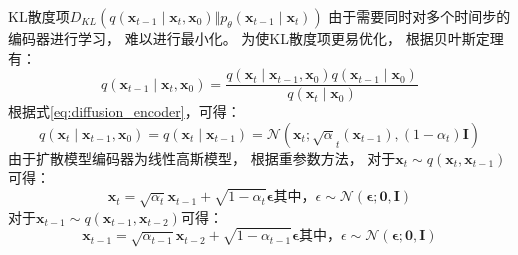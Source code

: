 KL散度项{$D_{KL}(q(\bm{x}_{t-1}\mid \bm{x}_{t},\bm{x}_0)\Vert p_{\theta}(\bm{x}_{t-1}\mid \bm{x}_{t})) $}
由于需要同时对多个时间步的编码器进行学习，
难以进行最小化。
为使KL散度项更易优化，
根据贝叶斯定理有：
\begin{equation}
    \label{eq:diffusion_gaussion_transition_for_kl_divergence}
    q(\bm{x}_{t-1}\mid \bm{x}_{t},\bm{x}_0)=\frac{q(\bm{x}_{t}\mid \bm{x}_{t-1},\bm{x}_0) q(\bm{x}_{t-1}\mid \bm{x}_0)}{q(\bm{x}_{t}\mid \bm{x}_0) }
\end{equation}
根据式{\ref{eq:diffusion_encoder}}，可得：
\begin{equation}
    \label{eq:diffusion_gaussion_transition_for_kl_divergence_likelihood}
    q(\bm{x}_{t}\mid \bm{x}_{t-1},\bm{x}_0)=q(\bm{x}_{t}\mid \bm{x}_{t-1})=\mathcal{N}(\bm{x}_{t}; \sqrt{\alpha}_{t}(\bm{x}_{t-1}), (1-\alpha_t)\bm{I})
\end{equation}
由于扩散模型编码器为线性高斯模型，
根据重参数方法，
对于{$\bm{x}_{t}\sim q(\bm{x}_{t},\bm{x}_{t-1})$}可得：
\begin{equation}
    \bm{x}_{t}=\sqrt{\alpha_{t}}\bm{x}_{t-1}+\sqrt{1-\alpha_{t}}\bm{\epsilon} \mbox{其中，} \epsilon \sim \mathcal{N}(\bm{\epsilon};\bm{0},\bm{I})
\end{equation}
对于{$\bm{x}_{t-1}\sim q(\bm{x}_{t-1},\bm{x}_{t-2})$}可得：
\begin{equation}
    \bm{x}_{t-1}=\sqrt{\alpha_{t-1}}\bm{x}_{t-2}+\sqrt{1-\alpha_{t-1}}\bm{\epsilon} \mbox{其中，} \epsilon \sim \mathcal{N}(\bm{\epsilon};\bm{0},\bm{I})
\end{equation}

